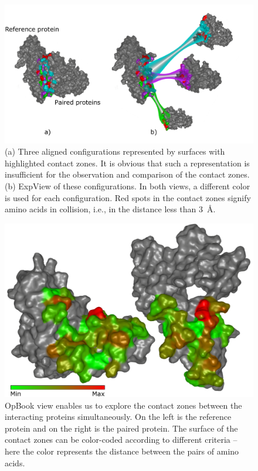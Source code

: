\documentclass{bmcart}
\begin{document}
\begin{backmatter}
\begin{figure}[h!]
    \centering
    \includegraphics[width=\columnwidth]{images/figure5.pdf}
    \caption{
    (a) Three aligned configurations represented by surfaces with highlighted contact zones. It is obvious that such a representation is insufficient for the observation and comparison of the contact zones. (b) ExpView of these configurations. In both views, a different color is used for each configuration. Red spots in the contact zones signify amino acids in collision, i.e., in the distance less than 3~\AA.}
	\label{fig:case12}
\end{figure}

\begin{figure}[h!]
  \centering
  \includegraphics[width=\columnwidth]{images/figure6.pdf}
  \caption{ OpBook view enables us to explore the contact zones between the interacting proteins simultaneously. On the left is the reference protein and on the right is the paired protein. The surface of the contact zones can be color-coded according to different criteria -- here the color represents the distance between the pairs of amino acids.}
  \label{fig:book}
\end{figure}


\end{backmatter}
\end{document}
